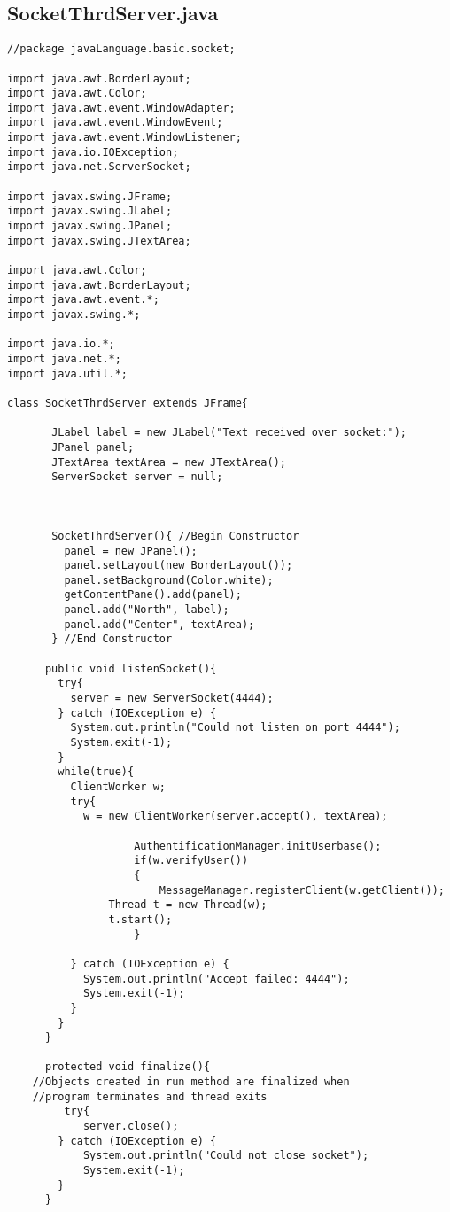 \documentclass[12pt]{article}
\theoremstyle{plain}
\begin{document}
\subsection{SocketThrdServer.java}
\begin{lstlisting}
//package javaLanguage.basic.socket;

import java.awt.BorderLayout;
import java.awt.Color;
import java.awt.event.WindowAdapter;
import java.awt.event.WindowEvent;
import java.awt.event.WindowListener;
import java.io.IOException;
import java.net.ServerSocket;

import javax.swing.JFrame;
import javax.swing.JLabel;
import javax.swing.JPanel;
import javax.swing.JTextArea;

import java.awt.Color;
import java.awt.BorderLayout;
import java.awt.event.*;
import javax.swing.*;

import java.io.*;
import java.net.*;
import java.util.*;

class SocketThrdServer extends JFrame{

	   JLabel label = new JLabel("Text received over socket:");
	   JPanel panel;
	   JTextArea textArea = new JTextArea();
	   ServerSocket server = null;



	   SocketThrdServer(){ //Begin Constructor
	     panel = new JPanel();
	     panel.setLayout(new BorderLayout());
	     panel.setBackground(Color.white);
	     getContentPane().add(panel);
	     panel.add("North", label);
	     panel.add("Center", textArea);
	   } //End Constructor

	  public void listenSocket(){
	    try{
	      server = new ServerSocket(4444);
	    } catch (IOException e) {
	      System.out.println("Could not listen on port 4444");
	      System.exit(-1);
	    }
	    while(true){
	      ClientWorker w;
	      try{
	        w = new ClientWorker(server.accept(), textArea);

					AuthentificationManager.initUserbase();
					if(w.verifyUser())
					{
						MessageManager.registerClient(w.getClient());
		        Thread t = new Thread(w);
		        t.start();
					}

	      } catch (IOException e) {
	        System.out.println("Accept failed: 4444");
	        System.exit(-1);
	      }
	    }
	  }

	  protected void finalize(){
	//Objects created in run method are finalized when
	//program terminates and thread exits
	     try{
	        server.close();
	    } catch (IOException e) {
	        System.out.println("Could not close socket");
	        System.exit(-1);
	    }
	  }


\end{lstlisting}
\end{document}

